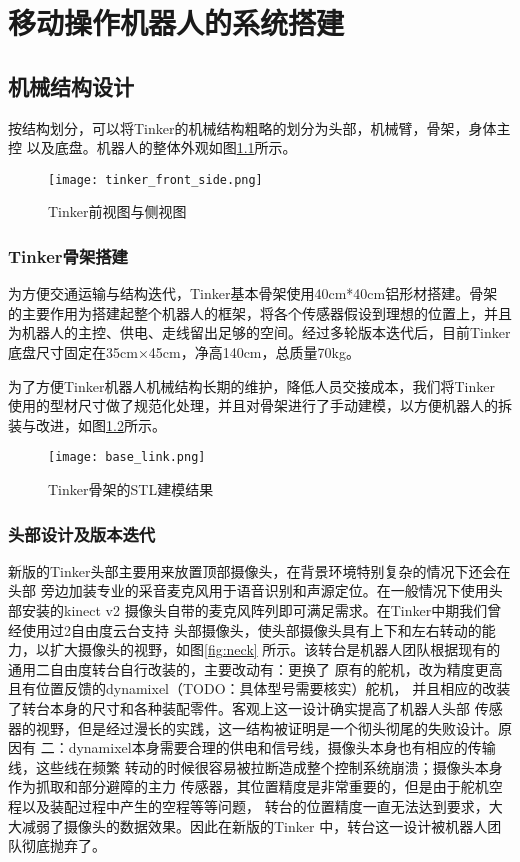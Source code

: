 
\chapter{移动操作机器人的系统搭建}
\label{cha:chapter02}


\section{机械结构设计}

按结构划分，可以将Tinker的机械结构粗略的划分为头部，机械臂，骨架，身体主控
以及底盘。机器人的整体外观如图\ref{fig:tinker_front_side}所示。

\begin{figure}[ht] %
  \centering
  \texttt{[image: tinker\_front\_side.png]}
  \caption{Tinker前视图与侧视图}
  \label{fig:tinker_front_side}
\end{figure}

\subsection{Tinker骨架搭建}
为方便交通运输与结构迭代，Tinker基本骨架使用40cm*40cm铝形材搭建。骨架
的主要作用为搭建起整个机器人的框架，将各个传感器假设到理想的位置上，并且
为机器人的主控、供电、走线留出足够的空间。经过多轮版本迭代后，目前Tinker
底盘尺寸固定在35cm×45cm，净高140cm，总质量70kg。

为了方便Tinker机器人机械结构长期的维护，降低人员交接成本，我们将Tinker
使用的型材尺寸做了规范化处理，并且对骨架进行了手动建模，以方便机器人的拆
装与改进，如图\ref{fig:base_link}所示。

\begin{figure}[ht] %
  \centering
  \texttt{[image: base\_link.png]}
  \caption{Tinker骨架的STL建模结果}
  \label{fig:base_link}
\end{figure}

\subsection{头部设计及版本迭代}

新版的Tinker头部主要用来放置顶部摄像头，在背景环境特别复杂的情况下还会在头部
旁边加装专业的采音麦克风用于语音识别和声源定位。在一般情况下使用头部安装的kinect v2
摄像头自带的麦克风阵列即可满足需求。在Tinker中期我们曾经使用过2自由度云台支持
头部摄像头，使头部摄像头具有上下和左右转动的能力，以扩大摄像头的视野，如图\ref{fig:neck}
所示。该转台是机器人团队根据现有的通用二自由度转台自行改装的，主要改动有：更换了
原有的舵机，改为精度更高且有位置反馈的dynamixel（TODO：具体型号需要核实）舵机，
并且相应的改装了转台本身的尺寸和各种装配零件。客观上这一设计确实提高了机器人头部
传感器的视野，但是经过漫长的实践，这一结构被证明是一个彻头彻尾的失败设计。原因有
二：dynamixel本身需要合理的供电和信号线，摄像头本身也有相应的传输线，这些线在频繁
转动的时候很容易被拉断造成整个控制系统崩溃；摄像头本身作为抓取和部分避障的主力
传感器，其位置精度是非常重要的，但是由于舵机空程以及装配过程中产生的空程等等问题，
转台的位置精度一直无法达到要求，大大减弱了摄像头的数据效果。因此在新版的Tinker
中，转台这一设计被机器人团队彻底抛弃了。

